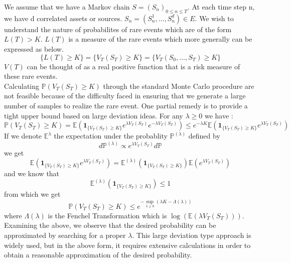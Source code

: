 We assume that we have a Markov chain $S=(S_n)_{0 \leq n \leq T}$. At each time step n, we have d correlated assets or sources. $S_n = (S_n^1,...,S_n^d) \in \mathit{E}$. We wish to understand the nature of probabilites of rare events which are of the form $L(T) > K$. $L(T)$ is a measure of the rare events which more generally can be expressed as below.
$$
\{L(T) \geq K\} = \{V_T(S_T)\geq K\} = \{V_T(S_0,...,S_T)\geq K\}
$$
$V(T)$ can be thought of as a real positive function that is a risk measure of these rare events.\\
Calculating $\mathbb{P}(V_T(S_T) \geq K)$ through the standard Monte Carlo procedure are not feasible because of the difficulty faced in ensuring that we generate a large number of samples to realize the rare event. One partial remedy is to provide a tight upper bound based on large deviation ideas. For any $\lambda \geq 0$ we have :
\begin{equation}
	\mathbb{P}(V_T(S_T)\geq K) = \mathbb{E}\left( \mathbf{1}_{\{V_T(S_T)\geq K\}} e^{\lambda V_T(S_T)} e^{-\lambda V_T(S_T)} \right) \leq
	e^{-\lambda K}\mathbb{E}\left( \mathbf{1}_{\{V_T(S_T)\geq K\}}e^{\lambda V_T(S_T)} \right)
\end{equation}
If we denote $\mathbb{E^{\lambda}}$ the expectation under the probablity $\mathbb{P}^{(\lambda)}$ defined by
$$d\mathbb{P}^{(\lambda)} \propto e^{\lambda V_T(S_T)}d\mathbb{P}$$
we get 
$$\mathbb{E}\left( \mathbf{1}_{\{V_T(S_T)\geq K\}}e^{\lambda V_T(S_T)}  \right) = \mathbb{E}^{(\lambda)}\left(\mathbf{1}_{\{V_T(S_T)\geq K\}}\right)\mathbb{E}\left(e^{\lambda V_T(S_T)}\right)$$
and we know that
$$\mathbb{E}^{(\lambda)}\left(\mathbf{1}_{\{V_T(S_T)\geq K\}}\right)\leq 1 $$
from which we get
\begin{equation}
	\mathbb{P}\left(V_T(S_T) \geq K\right) \leq e^{-\sup_{\lambda\geq 0}(\lambda K - \Lambda(\lambda))}
\end{equation}
where $\Lambda(\lambda)$ is the Fenchel Transformation which is $\log (\mathbb{E}(\lambda V_T(S_T)))$.\\
Examining the above, we observe that the desired probability can be approximated by searching for a proper $\lambda$. This large deviation type approach is widely used, but in the above form, it requires extensive calculations in order to obtain a reasonable approximation of the desired probability.\\


